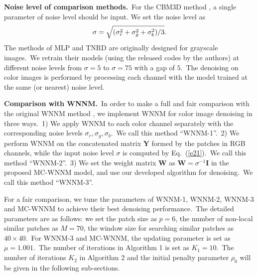 \documentclass[10pt,twocolumn,letterpaper]{article}
\begin{document}
\textbf{Noise level of comparison methods.}\ 
For the CBM3D method \cite{cbm3d}, a single parameter of noise level should be input. We set the noise level as
\vspace{-3mm}
\begin{equation}
\label{e21}
\vspace{-3mm}
\sigma = \sqrt{(\sigma_{r}^{2}+\sigma_{g}^{2}+\sigma_{b}^{2})/3}.
\end{equation}
The methods of MLP \cite{mlp} and TNRD \cite{chen2015learning} are originally designed for grayscale images.\ We retrain their models (using the released codes by the authors) at different noise levels from $\sigma=5$ to $\sigma=75$ with a gap of $5$.\ The denoising on color images is performed by processing each channel with the model trained at the same (or nearest) noise level. 

\textbf{Comparison with WNNM.}\
In order to make a full and fair comparison with the original WNNM method \cite{wnnmijcv}, we implement WNNM for color image denoising in three ways.\ 
1) We apply WNNM to each color channel separately with the corresponding noise levels $\sigma_{r}, \sigma_{g}, \sigma_{b}$.\ We call this method ``WNNM-1''.\
2) We perform WNNM on the concatenated matrix $\mathbf{Y}$ formed by the patches in RGB channels, while the input noise level $\sigma$ is computed by Eq.\ (\ref{e21}).\ We call this method ``WNNM-2''.\
3) We set the weight matrix $\mathbf{W}$ as $\mathbf{W}=\sigma^{-1}\mathbf{I}$ in the proposed MC-WNNM model, and use our developed algorithm for denoising.\ We call this method ``WNNM-3''.

For a fair comparison, we tune the parameters of WNNM-1, WNNM-2, WNNM-3 and MC-WNNM to achieve their best denoising performance.\ The detailed parameters are as follows: we set the patch size as $p = 6$, the number of non-local similar patches as $M = 70$, the window size for searching similar patches as $40\times40$.\ For WNNM-3 and MC-WNNM, the updating parameter is set as $\mu=1.001$.\ The number of iterations in Algorithm 1 is set as $K_{1} = 10$.\ The number of iterations $K_{2}$ in Algorithm 2 and the initial penalty parameter $\rho_{0}$ will be given in the following sub-sections.
\end{document}
